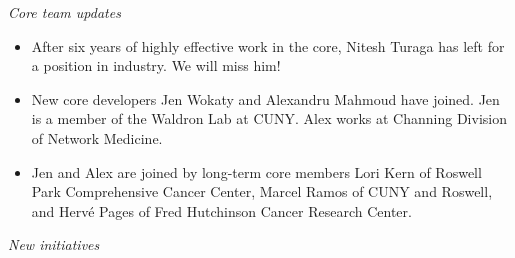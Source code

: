 \textit{Core team updates}
\begin{itemize}
\item After six years of highly effective work in the core, Nitesh
Turaga has left for a position in industry.  We will miss him!
\item New core developers Jen Wokaty and Alexandru Mahmoud have
joined.  Jen is a member of the Waldron Lab at CUNY.  Alex works
at Channing Division of Network Medicine.
\item Jen and Alex are joined by long-term core members Lori Kern of Roswell Park
Comprehensive Cancer Center, Marcel Ramos of CUNY and Roswell,
and Herv\'e Pages of Fred Hutchinson Cancer Research Center.
\end{itemize}

\textit{New initiatives}

